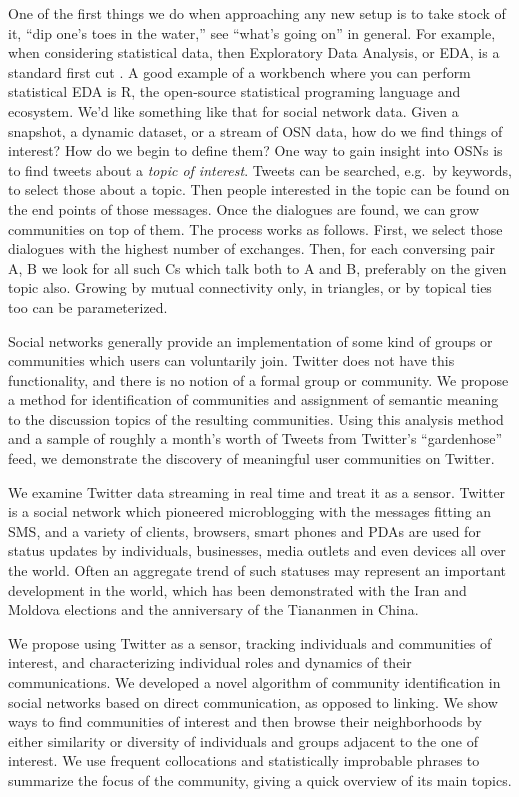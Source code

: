 \documentclass[10pt,oneside]{memoir}
\begin{document}
One of the first things we do when approaching any new setup is to take stock of it, ``dip one's toes in the water,'' see ``what's going on'' in general.  For example, when considering statistical data, then Exploratory Data Analysis, or EDA, is a standard first cut \cite{Tukey:1977:EDA}.  A good example of a workbench where you can perform statistical EDA is R, the open-source statistical programing language and ecosystem.
We'd like something like that for social network data.  Given a snapshot, a dynamic dataset, or a stream of OSN data, how do we find things of interest?  How do we begin to define them?
One way to gain insight into OSNs is to find tweets about a {\itshape topic of interest}.  Tweets can be searched, e.g.\ by keywords, to select those about a topic.  Then people interested in the topic can be found on the end points of those messages.
Once the dialogues are found, we can grow communities on top of them.  The process works as follows.
First, we select those dialogues with the highest number of exchanges.  Then, for each conversing pair {A, B} we look for all such Cs which talk both to A and B, preferably on the given topic also.  Growing by mutual connectivity only, in triangles, or by topical ties too can be parameterized.


Social networks generally provide an implementation of some kind of groups or communities which users can voluntarily join.  Twitter does not have this functionality, and there is no notion of a formal group or community.  We propose a method for identification of communities and assignment of semantic meaning to the discussion topics of the resulting communities.  Using this analysis method and a sample of roughly a month's worth of Tweets from Twitter's ``gardenhose'' feed, we demonstrate the discovery of meaningful user communities on Twitter.


We examine Twitter data streaming in real time and treat it as a sensor.  Twitter is a social network which pioneered microblogging with the messages fitting an SMS, and a variety of clients, browsers, smart phones and PDAs are used for status updates by individuals, businesses, media outlets and even devices all over the world.  Often an aggregate trend of such statuses may represent an important development in the world, which has been demonstrated with the Iran and Moldova elections and the anniversary of the Tiananmen in China.


We propose using Twitter as a sensor, tracking individuals and communities of interest, and characterizing individual roles and dynamics of their communications.  We developed a novel algorithm of community identification in social networks based on direct communication, as opposed to linking.  We show ways to find communities of interest and then browse their neighborhoods by either similarity or diversity of individuals and groups adjacent to the one of interest.  We use frequent collocations and statistically improbable phrases to summarize the focus of the community, giving a quick overview of its main topics.  
\end{document}
